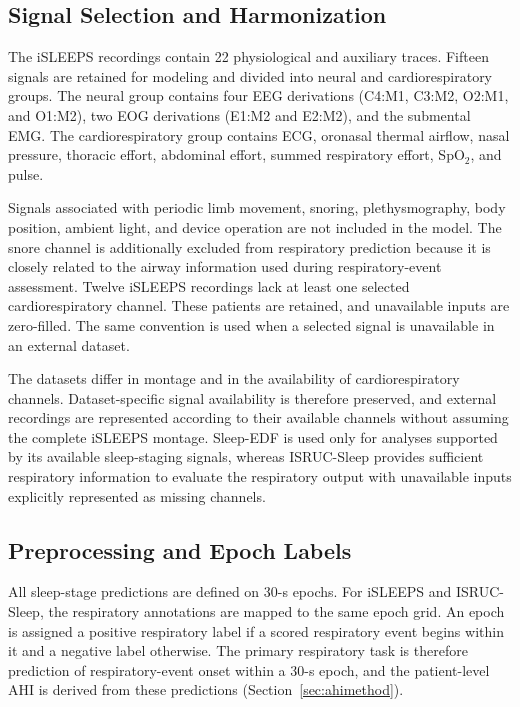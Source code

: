 \documentclass[a4paper,fleqn]{cas-sc}
\begin{document}
\subsection{Signal Selection and Harmonization}

The iSLEEPS recordings contain 22 physiological and auxiliary traces. Fifteen
signals are retained for modeling and divided into neural and
cardiorespiratory groups. The neural group contains four EEG derivations
(C4:M1, C3:M2, O2:M1, and O1:M2), two EOG derivations (E1:M2 and E2:M2), and
the submental EMG. The cardiorespiratory group contains ECG, oronasal thermal
airflow, nasal pressure, thoracic effort, abdominal effort, summed respiratory
effort, SpO$_2$, and pulse.

Signals associated with periodic limb movement, snoring, plethysmography, body
position, ambient light, and device operation are not included in the model.
The snore channel is additionally excluded from respiratory prediction because
it is closely related to the airway information used during respiratory-event
assessment. Twelve iSLEEPS recordings lack at least one selected
cardiorespiratory channel. These patients are retained, and unavailable inputs
are zero-filled. The same
convention is used when a selected signal is unavailable in an external
dataset.

The datasets differ in montage and in the availability of
cardiorespiratory channels. Dataset-specific signal availability is therefore preserved, and external recordings are represented according to their available channels without assuming the complete iSLEEPS montage. Sleep-EDF is used only for analyses supported by its available sleep-staging signals, whereas ISRUC-Sleep provides sufficient
respiratory information to evaluate the respiratory output with unavailable inputs explicitly represented as missing channels.

\subsection{Preprocessing and Epoch Labels}

All sleep-stage predictions are defined on 30-s epochs. For iSLEEPS and
ISRUC-Sleep, the respiratory annotations are mapped to the same epoch grid. An
epoch is assigned a positive respiratory label if a scored respiratory event begins
within it and a negative label otherwise. The primary
respiratory task is therefore prediction of respiratory-event onset within
a 30-s epoch, and the patient-level AHI is derived from these predictions
(Section~\ref{sec:ahimethod}).
\end{document}
